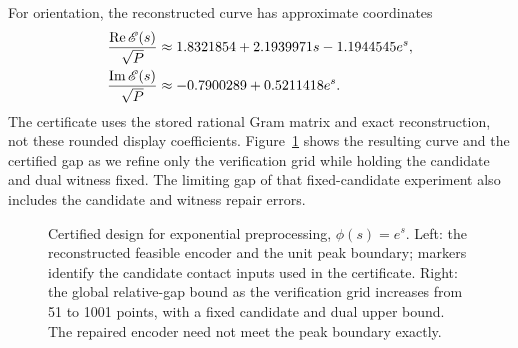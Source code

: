For orientation, the reconstructed curve has approximate coordinates
\begin{align*}
 \frac{\operatorname{Re}\mathscr E(s)}{\sqrt P}
 &\approx1.8321854+2.1939971s-1.1944545e^s,\\
 \frac{\operatorname{Im}\mathscr E(s)}{\sqrt P}
 &\approx-0.7900289+0.5211418e^s.
\end{align*}
The certificate uses the stored rational Gram matrix and exact reconstruction, not these rounded display coefficients. Figure~\ref{fig:certified} shows the resulting curve and the certified gap as we refine only the verification grid while holding the candidate and dual witness fixed. The limiting gap of that fixed-candidate experiment also includes the candidate and witness repair errors. 

\begin{figure}[t]
 \centering{}
 \caption{Certified design for exponential preprocessing, $\phi(s)=e^s$. Left: the reconstructed feasible encoder and the unit peak boundary; markers identify the candidate contact inputs used in the certificate. Right: the global relative-gap bound as the verification grid increases from 51 to 1001 points, with a fixed candidate and dual upper bound. The repaired encoder need not meet the peak boundary exactly.}
 \label{fig:certified}
\end{figure}
